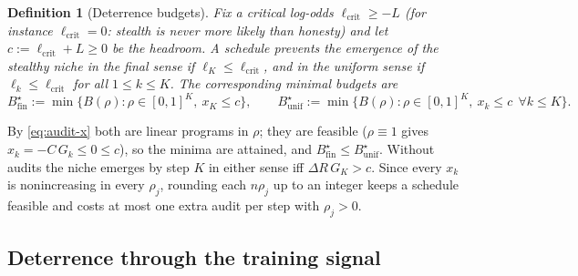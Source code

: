 \documentclass[11pt,a4paper]{article}
\newtheorem{definition}[theorem]{Definition}
\begin{document}
\begin{definition}[Deterrence budgets]\label{def:audit-budgets}
Fix a critical log-odds $\ell_{\mathrm{crit}}\ge -L$ (for instance
$\ell_{\mathrm{crit}}=0$: stealth is never more likely than honesty) and let
$c:=\ell_{\mathrm{crit}}+L\ge0$ be the \emph{headroom}. A schedule prevents the
emergence of the stealthy niche in the \emph{final} sense if
$\ell_K\le\ell_{\mathrm{crit}}$, and in the \emph{uniform} sense if
$\ell_k\le\ell_{\mathrm{crit}}$ for all $1\le k\le K$. The corresponding minimal
budgets are
\[
  B^\star_{\mathrm{fin}}:=\min\{B(\rho):\rho\in[0,1]^K,\ x_K\le c\},\qquad
  B^\star_{\mathrm{unif}}:=\min\{B(\rho):\rho\in[0,1]^K,\ x_k\le c\ \ \forall k\le K\}.
\]
\end{definition}
By \eqref{eq:audit-x} both are linear programs in $\rho$; they are feasible
($\rho\equiv1$ gives $x_k=-C\,G_k\le0\le c$), so the minima are attained, and
$B^\star_{\mathrm{fin}}\le B^\star_{\mathrm{unif}}$. Without audits the niche
emerges by step $K$ in either sense iff $\Delta R\,G_K>c$. Since every $x_k$ is
nonincreasing in every $\rho_j$, rounding each $n\rho_j$ up to an integer keeps
a schedule feasible and costs at most one extra audit per step with $\rho_j>0$.

\subsection{Deterrence through the training signal}
\end{document}
